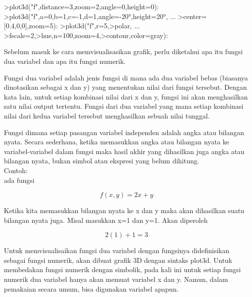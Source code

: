 \documentclass[a4paper,10pt]{article}
\begin{document}
\begin{eulernotebook}
\begin{eulercomment}
\begin{eulercomment}
\begin{euleroutput}
  [5,  2.6,  2,  0.4]
\end{euleroutput}
\begin{eulerprompt}
>plot3d("f",distance=3,zoom=2,angle=0,height=0):
>plot3d("f",a=0,b=1,c=-1,d=1,angle=-20°,height=20°, ...
>center=[0.4,0,0],zoom=5):
>plot3d("f",r=5,>polar, ...
>fscale=2,>hue,n=100,zoom=4,>contour,color=gray):
\end{eulerprompt}
\begin{eulercomment}
Sebelum masuk ke cara memvisualisasikan grafik, perlu diketahui apa
itu fungsi dua variabel dan apa itu fungsi numerik.

\end{eulercomment}
\begin{eulercomment}
Fungsi dua variabel adalah jenis fungsi di mana ada dua variabel bebas
(biasanya dinotasikan sebagai x dan y) yang menentukan nilai dari
fungsi tersebut. Dengan kata lain, untuk setiap kombinasi nilai dari x
dan y, fungsi ini akan menghasilkan satu nilai output tertentu. Fungsi
dari dua variabel yang mana setiap kombinasi nilai dari kedua variabel
tersebut menghasilkan sebuah nilai tunggal.


\end{eulercomment}
\begin{eulercomment}
Fungsi dimana setiap pasangan variabel independen adalah angka atau
bilangan nyata. Secara sederhana, ketika memasukkan angka atau
bilangan nyata ke variabel-variabel dalam fungsi maka hasil akhir yang
dihasilkan juga angka atau bilangan nyata, bukan simbol atau ekspresi
yang belum dihitung.\\
Contoh:\\
ada fungsi\\
\end{eulercomment}
\begin{eulerformula}
\[
f(x,y)=2x+y
\]
\end{eulerformula}
\begin{eulercomment}
Ketika kita memasukkan bilangan nyata ke x dan y maka akan dihasilkan
suatu bilangan nyata juga. Misal masukkan x=1 dan y=1. Akan diperoleh

\end{eulercomment}
\begin{eulerformula}
\[
2(1)+1=3
\]
\end{eulerformula}
\begin{eulercomment}
\end{eulercomment}
\begin{eulercomment}
Untuk memvisualisaikan fungsi dua variabel dengan fungsinya
didefinisikan sebagai fungsi numerik, akan dibuat grafik 3D dengan
sintaks plot3d. Untuk membedakan fungsi numerik dengan simbolik, pada
kali ini untuk setiap fungsi numerik dua variabel hanya akan memuat
variabel x dan y. Namun, dalam pemakaian secara umum, bisa digunakan
variabel apapun.


\end{eulercomment}
\end{eulercomment}
\end{eulercomment}
\end{eulernotebook}
\end{document}
